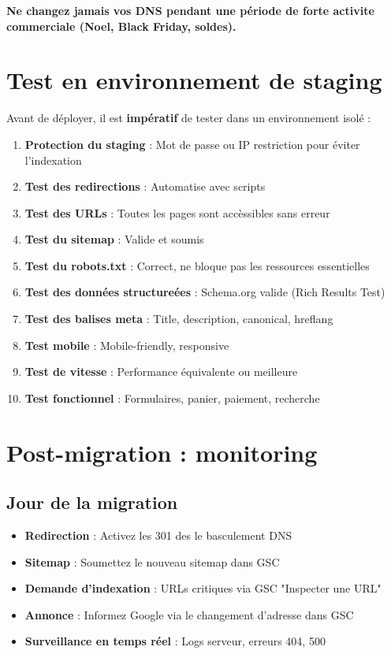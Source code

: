 \documentclass[12pt,a4paper,twoside]{report}
\newcommand{\important}[1]{\textbf{\textcolor{googlered}{#1}}}
\begin{document}
\important{Ne changez jamais vos DNS pendant une période de forte activite commerciale (Noel, Black Friday, soldes).}

\section{Test en environnement de staging}

Avant de déployer, il est \important{impératif} de tester dans un environnement isolé :

\begin{enumerate}
    \item \textbf{Protection du staging} : Mot de passe ou IP restriction pour éviter l'indexation
    \item \textbf{Test des redirections} : Automatise avec scripts
    \item \textbf{Test des URLs} : Toutes les pages sont accèssibles sans erreur
    \item \textbf{Test du sitemap} : Valide et soumis
    \item \textbf{Test du robots.txt} : Correct, ne bloque pas les ressources essentielles
    \item \textbf{Test des données structureées} : Schema.org valide (Rich Results Test)
    \item \textbf{Test des balises meta} : Title, description, canonical, hreflang
    \item \textbf{Test mobile} : Mobile-friendly, responsive
    \item \textbf{Test de vitesse} : Performance équivalente ou meilleure
    \item \textbf{Test fonctionnel} : Formulaires, panier, paiement, recherche
\end{enumerate}

\section{Post-migration : monitoring}

\subsection{Jour de la migration}

\begin{itemize}
    \item \textbf{Redirection} : Activez les 301 des le basculement DNS
    \item \textbf{Sitemap} : Soumettez le nouveau sitemap dans GSC
    \item \textbf{Demande d'indexation} : URLs critiques via GSC "Inspecter une URL"
    \item \textbf{Annonce} : Informez Google via le changement d'adresse dans GSC
    \item \textbf{Surveillance en temps réel} : Logs serveur, erreurs 404, 500
\end{itemize}
\end{document}
